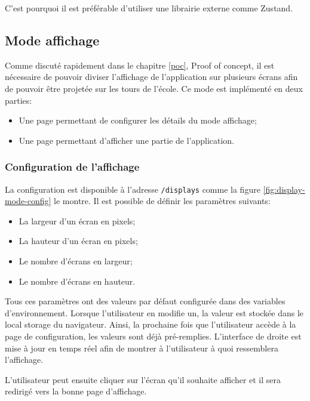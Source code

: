 C'est pourquoi il est préférable d'utiliser une librairie externe comme Zustand.

\subsection{Mode affichage}
\label{display-mode}

Comme discuté rapidement dans le chapitre \ref{poc}, Proof of concept, il est nécessaire de pouvoir diviser l'affichage de l'application sur plusieurs écrans afin de pouvoir être projetée sur les tours de l'école. Ce mode est implémenté en deux parties:

\begin{itemize}
  \item Une page permettant de configurer les détails du mode affichage;
  \item Une page permettant d'afficher une partie de l'application.
\end{itemize}

\subsubsection{Configuration de l'affichage}

La configuration est disponible à l'adresse \texttt{/displays} comme la figure \ref{fig:display-mode-config} le montre. Il est possible de définir les paramètres suivants:

\begin{itemize}
  \item La largeur d'un écran en pixels;
  \item La hauteur d'un écran en pixels;
  \item Le nombre d'écrans en largeur;
  \item Le nombre d'écrans en hauteur.
\end{itemize}

Tous ces paramètres ont des valeurs par défaut configurée dans des variables d'environnement. Lorsque l'utilisateur en modifie un, la valeur est stockée dans le local storage du navigateur. Ainsi, la prochaine fois que l'utilisateur accède à la page de configuration, les valeurs sont déjà pré-remplies. L'interface de droite est mise à jour en temps réel afin de montrer à l'utilisateur à quoi ressemblera l'affichage.

L'utilisateur peut ensuite cliquer sur l'écran qu'il souhaite afficher et il sera redirigé vers la bonne page d'affichage.


